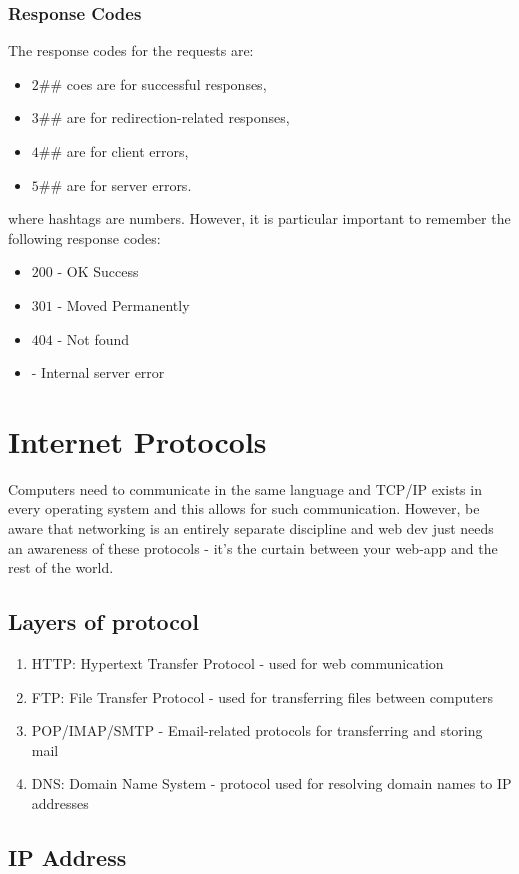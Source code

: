 \documentclass[a4paper]{article}
\theoremstyle{plain}
\theoremstyle{definition}
\theoremstyle{remark}
\begin{document}
\begin{flushleft}
\subsubsection{Response Codes}
The response codes for the requests are:
\begin{itemize}
	\item $2\#\#$ coes are for successful responses,
	\item $3\#\#$ are for redirection-related responses,
	\item $4\#\#$ are for client errors,
	\item $5\#\#$ are for server errors.
\end{itemize}
where hashtags are numbers.
However, it is particular important to remember the following response codes:
\begin{itemize}
	\item $200$ - OK Success
	\item $301$ - Moved Permanently 
	\item $404$ - Not found
	\item - Internal server error
\end{itemize}
\section{Internet Protocols}
Computers need to communicate in the same language and TCP/IP exists in every operating system and this allows for such communication. However, be aware that networking is an entirely separate discipline and web dev just needs an awareness of these protocols - it's the curtain between your web-app and the rest of the world. 
\subsection{Layers of protocol}	
\begin{enumerate}
	\item HTTP: Hypertext Transfer Protocol - used for web communication
	\item FTP: File Transfer Protocol - used for transferring files between computers
	\item POP/IMAP/SMTP - Email-related protocols for transferring and storing mail
	\item DNS: Domain Name System - protocol used for resolving domain names to IP addresses
\end{enumerate}
\subsection{IP Address}

\end{flushleft}
\end{document}
